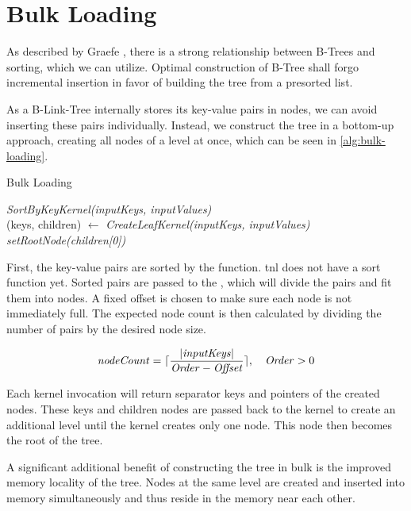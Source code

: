 \section{Bulk Loading}

As described by Graefe \cite{goetz-tech}, there is a strong relationship between B-Trees and sorting, which we can utilize. Optimal construction of B-Tree shall forgo incremental insertion in favor of building the tree from a presorted list.

As a B-Link-Tree internally stores its key-value pairs in nodes, we can avoid inserting these pairs individually. Instead, we construct the tree in a bottom-up approach, creating all nodes of a level at once, which can be seen in \cref{alg:bulk-loading}.

\begin{algorithm}[H]
  \caption{Bulk Loading}\label{alg:bulk-loading}

  \textit{SortByKeyKernel(inputKeys, inputValues)}\\

  (keys, children) $\gets$ \textit{CreateLeafKernel(inputKeys, inputValues)}\\
  \textit{setRootNode(children[0])}
\end{algorithm}

First, the key-value pairs are sorted by the  function. \acrshort{tnl} does not have a sort function yet. Sorted pairs are passed to the , which will divide the pairs and fit them into nodes. A fixed offset is chosen to make sure each node is not immediately full. 
The expected node count is then calculated by dividing the number of pairs by the desired node size.  

$$\mathit{nodeCount} = \lceil\frac{|\mathit{inputKeys}|}{\mathit{Order} - \mathit{Offset}}\rceil,\quad \begin{aligned} \mathit{Order} > 0\end{aligned}$$

Each kernel invocation will return separator keys and pointers of the created nodes. These keys and children nodes are passed back to the kernel to create an additional level until the kernel creates only one node. This node then becomes the root of the tree.

A significant additional benefit of constructing the tree in bulk is the improved memory locality of the tree. Nodes at the same level are created and inserted into memory simultaneously and thus reside in the memory near each other.


